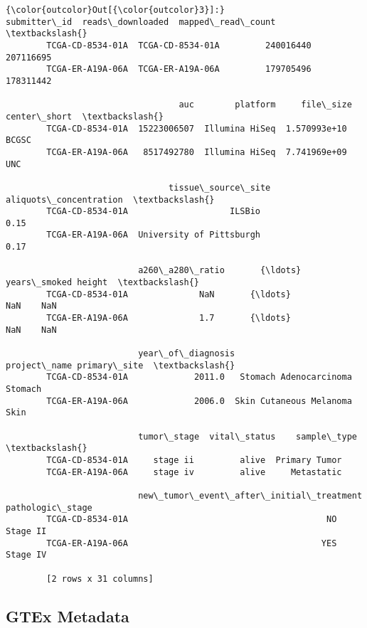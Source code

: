 \documentclass[11pt]{article}
\begin{document}
\begin{Verbatim}[commandchars=\\\{\}]
{\color{outcolor}Out[{\color{outcolor}3}]:}                       submitter\_id  reads\_downloaded  mapped\_read\_count  \textbackslash{}
        TCGA-CD-8534-01A  TCGA-CD-8534-01A         240016440          207116695   
        TCGA-ER-A19A-06A  TCGA-ER-A19A-06A         179705496          178311442   
        
                                  auc        platform     file\_size center\_short  \textbackslash{}
        TCGA-CD-8534-01A  15223006507  Illumina HiSeq  1.570993e+10        BCGSC   
        TCGA-ER-A19A-06A   8517492780  Illumina HiSeq  7.741969e+09          UNC   
        
                                tissue\_source\_site  aliquots\_concentration  \textbackslash{}
        TCGA-CD-8534-01A                    ILSBio                    0.15   
        TCGA-ER-A19A-06A  University of Pittsburgh                    0.17   
        
                          a260\_a280\_ratio       {\ldots}        years\_smoked height  \textbackslash{}
        TCGA-CD-8534-01A              NaN       {\ldots}                 NaN    NaN   
        TCGA-ER-A19A-06A              1.7       {\ldots}                 NaN    NaN   
        
                          year\_of\_diagnosis             project\_name primary\_site  \textbackslash{}
        TCGA-CD-8534-01A             2011.0   Stomach Adenocarcinoma      Stomach   
        TCGA-ER-A19A-06A             2006.0  Skin Cutaneous Melanoma         Skin   
        
                          tumor\_stage  vital\_status    sample\_type  \textbackslash{}
        TCGA-CD-8534-01A     stage ii         alive  Primary Tumor   
        TCGA-ER-A19A-06A     stage iv         alive     Metastatic   
        
                          new\_tumor\_event\_after\_initial\_treatment pathologic\_stage  
        TCGA-CD-8534-01A                                       NO         Stage II  
        TCGA-ER-A19A-06A                                      YES         Stage IV  
        
        [2 rows x 31 columns]
\end{Verbatim}
            
    \subsection{GTEx Metadata}\label{gtex-metadata}
\end{document}
